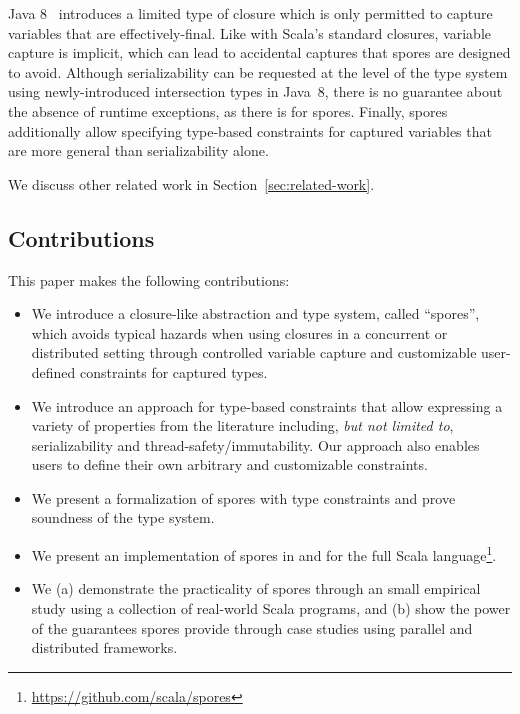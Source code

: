\documentclass{llncs}
\newcommand{\sporeurl}{\url{https://github.com/scala/spores}}
\begin{document}
{Java 8}~\cite{JavaLambdas,JavaLambdaTranslation} introduces a limited type of
closure which is only permitted to capture variables that are
effectively-final. Like with Scala's standard closures, variable capture is
implicit, which can lead to accidental captures that spores are designed to
avoid. Although serializability can be requested at the level of the type
system using newly-introduced intersection types in \mbox{Java 8}, there is no
guarantee about the absence of runtime exceptions, as there is for spores.
Finally, spores additionally allow specifying type-based constraints for
captured variables that are more general than serializability alone.

We discuss other related work in Section~\ref{sec:related-work}.

\subsection{Contributions}

This paper makes the following contributions:
\vspace{-1.5mm}
\begin{itemize}
\item We introduce a closure-like abstraction and type system,  called
``spores'', which avoids typical hazards when using closures in a concurrent
or distributed setting through controlled variable capture and customizable
user-defined constraints for captured types.

\item We introduce an approach for type-based constraints that allow
expressing  a variety of properties from the literature including, {\em but
not limited to}, serializability and thread-safety/immutability. Our approach
also enables users to define their own arbitrary and customizable constraints.

\item We present a formalization of spores with type constraints and  prove
soundness of the type system.

\item We present an implementation of spores in and for the full Scala
language\footnote{\sporeurl}.

\item We (a) demonstrate the practicality of spores through an small
empirical study using a collection of real-world Scala programs, and (b) show the power
of the guarantees spores provide through case studies using parallel and distributed frameworks.
\end{itemize}
\end{document}
